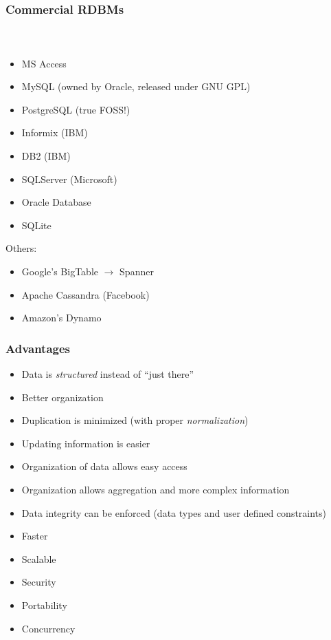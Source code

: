 \documentclass{beamer}
\begin{document}
\begin{frame}[allowframebreaks]
\end{frame}

\begin{frame}
    \frametitle{Commercial RDBMs}
    \framesubtitle{~}

\begin{itemize}
  \item MS Access 
  \item MySQL (owned by Oracle, released under GNU GPL)
  \item PostgreSQL (true FOSS!)
  \item Informix (IBM)
  \item DB2 (IBM)
  \item SQLServer (Microsoft)
  \item Oracle Database
  \item SQLite
\end{itemize}

Others:
\begin{itemize}
  \item Google's BigTable $\rightarrow$ Spanner
  \item Apache Cassandra (Facebook)
  \item Amazon's Dynamo
\end{itemize}

\end{frame}

\begin{frame}[allowframebreaks]
    \frametitle{Advantages}

\begin{itemize}
  \item Data is \emph{structured} instead of ``just there''
  \item Better organization
  \item Duplication is minimized (with proper \emph{normalization})
  \item Updating information is easier
  \item Organization of data allows easy access
  \item Organization allows aggregation and more complex information
\framebreak
  \item Data integrity can be enforced (data types and user defined constraints)
  \item Faster
  \item Scalable
  \item Security
  \item Portability
  \item Concurrency
\end{itemize}

\end{frame}
\end{document}
